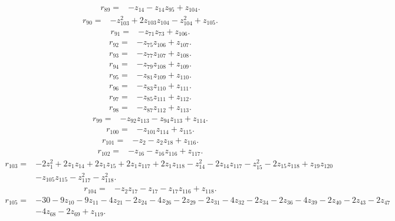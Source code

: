 \begin{align*}
 r_{89}={}&-z_{14}-z_{14}z_{95}+z_{104} .
\end{align*}
\begin{align*}
 r_{90}={}&-z_{103}^{2}+2z_{103}z_{104}-z_{104}^{2}+z_{105} .
\end{align*}
\begin{align*}
 r_{91}={}&-z_{71}z_{73}+z_{106} .
\end{align*}
\begin{align*}
 r_{92}={}&-z_{75}z_{106}+z_{107} .
\end{align*}
\begin{align*}
 r_{93}={}&-z_{77}z_{107}+z_{108} .
\end{align*}
\begin{align*}
 r_{94}={}&-z_{79}z_{108}+z_{109} .
\end{align*}
\begin{align*}
 r_{95}={}&-z_{81}z_{109}+z_{110} .
\end{align*}
\begin{align*}
 r_{96}={}&-z_{83}z_{110}+z_{111} .
\end{align*}
\begin{align*}
 r_{97}={}&-z_{85}z_{111}+z_{112} .
\end{align*}
\begin{align*}
 r_{98}={}&-z_{87}z_{112}+z_{113} .
\end{align*}
\begin{align*}
 r_{99}={}&-z_{92}z_{113}-z_{94}z_{113}+z_{114} .
\end{align*}
\begin{align*}
 r_{100}={}&-z_{101}z_{114}+z_{115} .
\end{align*}
\begin{align*}
 r_{101}={}&-z_{2}-z_{2}z_{18}+z_{116} .
\end{align*}
\begin{align*}
 r_{102}={}&-z_{16}-z_{16}z_{116}+z_{117} .
\end{align*}
\begin{align*}
 r_{103}={}&-2z_{1}^{2}+2z_{1}z_{14}+2z_{1}z_{15}+2z_{1}z_{117}+2z_{1}z_{118}-z_{14}^{2}-2z_{14}z_{117}-z_{15}^{2}-2z_{15}z_{118}+z_{19}z_{120}\\
 &-z_{105}z_{115}-z_{117}^{2}-z_{118}^{2} .
\end{align*}
\begin{align*}
 r_{104}={}&-z_{2}z_{17}-z_{17}-z_{17}z_{116}+z_{118} .
\end{align*}
\begin{align*}
 r_{105}={}&-30-9z_{10}-9z_{11}-4z_{21}-2z_{24}-4z_{26}-2z_{29}-2z_{31}-4z_{32}-2z_{34}-2z_{36}-4z_{39}-2z_{40}-2z_{43}-2z_{47}\\
 &-4z_{68}-2z_{69}+z_{119} .
\end{align*}

